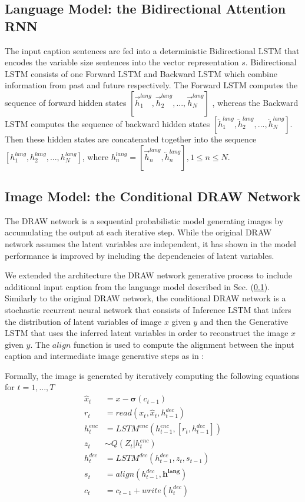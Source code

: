 \documentclass{article} %
\newcommand{\sigmoid}{\boldsymbol{\sigma}}
\newcommand{\hlang}{h^{lang}}
\newcommand{\hlangall}{\boldsymbol{h^{lang}}}
\newcommand{\hdec}{h^{dec}}
\newcommand{\henc}{h^{enc}}
\newcommand{\readop}{\mathit{read}}
\newcommand{\writeop}{\mathit{write}}
\newcommand{\encoder}{\mathit{LSTM}^{enc}}
\newcommand{\decoder}{\mathit{LSTM}^{dec}}
\newcommand{\canv}{c}
\newcommand{\lat}{z}
\newcommand{\Lat}{Z}
\newcommand{\post}{Q}
\begin{document}
\subsection{Language Model: the Bidirectional Attention RNN}
\label{sec:lang}
The input caption sentences are fed into a deterministic Bidirectional LSTM\cite{} that encodes the variable size sentences into the vector representation $s$. Bidirectional LSTM consists of one Forward LSTM and Backward LSTM which combine information from past and future respectively. The Forward LSTM computes the sequence of forward hidden states $[\overrightarrow{h}^{lang}_{1}, \overrightarrow{h}^{lang}_{2}, ..., \overrightarrow{h}^{lang}_{N}]$ , whereas the Backward LSTM computes the sequence of backward hidden states $[\overleftarrow{h}^{lang}_{1}, \overleftarrow{h}^{lang}_{2}, ..., \overleftarrow{h}^{lang}_{N}]$. Then these hidden states are concatenated together into the sequence $[\hlang_{1}, \hlang_{2}, ..., \hlang_{N}]$, where $\hlang_{n} = [\overrightarrow{h}^{lang}_{n}, \overleftarrow{h}^{lang}_{n}], 1\leq n\leq N$.

\subsection{Image Model: the Conditional DRAW Network}

The DRAW network \cite{gregor_draw} is a sequential probabilistic model generating images by accumulating the output at each iterative step. While the original DRAW network assumes the latent variables are independent, it has shown in \citep{bachman_sdm} the model performance is improved by including the dependencies of latent variables. 

We extended the architecture the DRAW network generative process to include additional input caption from the language model described in Sec. (\ref{sec:lang}). Similarly to the original DRAW network, the conditional DRAW network is a stochastic recurrent neural network that consists of Inference LSTM that infers the distribution of latent variables of image $x$ given $y$ and then the Generative LSTM that uses the inferred latent variables in order to reconstruct the image $x$ given $y$. The $align$ function is used to compute the alignment between the input caption and intermediate image generative steps as in \cite{bahdanau_mt}:

Formally, the image is generated by iteratively computing the following equations for $t=1,...,T$
\begin{align}
\label{eq:x_hat}
\hat{x}_t &= x-\sigmoid(\canv_{t-1})\\
\label{eq:read}
r_t &= \readop(x_t, \hat{x}_t, \hdec_{t-1})\\
\henc_t &= \encoder(\henc_{t-1}, [r_t, \hdec_{t-1}])\\
\lat_t &\sim \post(\Lat_t|\henc_t)\\
\hdec_t &= \decoder(\hdec_{t-1}, z_t, s_{t-1})\\
s_{t} &= align(\hdec_{t-1}, \hlangall) \\
\label{eq:write}
\canv_t &= \canv_{t-1} + \writeop(\hdec_t)
\end{align}
\end{document}
